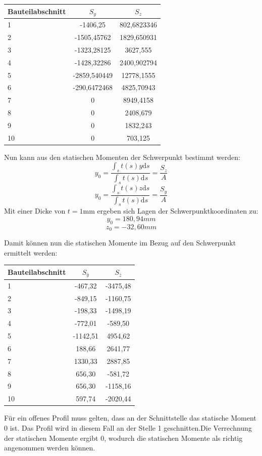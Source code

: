 \begin{center}
\begin{tabular}[h]{l|c|c}
	
Bauteilabschnitt&$S_{y}$&$S_{z}$\\
\hline
1& -1406,25&802,6823346\\
2&-1505,45762&1829,650931\\
3&-1323,28125&3627,555\\
4&-1428,32286&2400,902794\\
5&-2859,540449&12778,1555\\
6&-290,6472468&4825,70943\\
7&0&8949,4158\\
8&0&2408,679\\
9&0&1832,243\\
10&0&703,125\\
\end{tabular}
\end{center}

\noindent Nun kann aus den statischen Momenten der Schwerpunkt bestimmt werden:
\begin{equation}
	y_{0}=\frac{\int_{s}{}t(s)y\mathrm{d}s}{\int_{s}{}t(s)\mathrm{d}s}=\frac{S_{z}}{A}
\end{equation}
\begin{equation}
	y_{0}=\frac{\int_{s}{}t(s)z\mathrm{d}s}{\int_{s}{}t(s)\mathrm{d}s}=\frac{S_{y}}{A}
\end{equation}
Mit einer Dicke von $t=1\mathrm{mm}$ ergeben sich Lagen der Schwerpunktkoordinaten zu:
\begin{equation}
	y_{0}=180,94mm
\end{equation}
\begin{equation}
	z_{0}=-32,60mm
\end{equation}

Damit können nun die statischen Momente im Bezug auf den Schwerpunkt ermittelt werden:
\begin{center}
\begin{tabular}[h]{l|c|c}
Bauteilabschnitt&$S_{\bar{y}}$&$S_{\bar{z}}$\\
\hline
1&-467,32&-3475,48\\
2&-849,15&-1160,75\\
3&-198,33&-1498,19\\
4&-772,01&-589,50\\
5&-1142,51&4954,62\\
6&188,66&2641,77\\
7&1330,33&2887,85\\
8&656,30&-581,72\\
9&656,30&-1158,16\\
10&597,74&-2020,44\\
\end{tabular}
\end{center}
Für ein offenes Profil muss gelten, dass an der Schnittstelle das statische Moment $ 0 $ ist. Das Profil wird in diesem Fall an der Stelle 1 geschnitten.Die Verrechnung der statischen Momente ergibt 0, wodurch die statischen Momente als richtig angenommen werden können.


